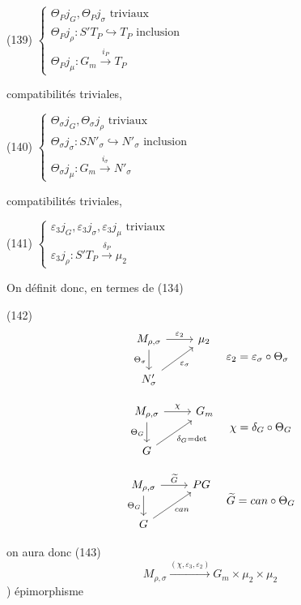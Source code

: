 \begin{enumerate}
\newpage


(139)
$\begin{cases}
\Theta_P j_G, \Theta_P j_\sigma \text{ triviaux} \\
\Theta_P j_\rho : S' T_P \hookrightarrow T_P \text{ inclusion} \\
\Theta_P j_\mu : G_m \xrightarrow{i_P} T_P
\end{cases}$

compatibilités triviales,

(140)
$\begin{cases}
\Theta_\sigma j_G, \Theta_\sigma j_\rho \text{ triviaux} \\
\Theta_\sigma j_\sigma : S N'_\sigma \hookrightarrow N'_\sigma \text{ inclusion} \\
\Theta_\sigma j_\mu : G_m \xrightarrow{i_\sigma} N'_\sigma
\end{cases}$

compatibilités triviales,

(141)
$\begin{cases}
\varepsilon_3 j_G, \varepsilon_3 j_\sigma, \varepsilon_3 j_\mu \text{ triviaux} \\
\varepsilon_3 j_\rho : S' T_P \xrightarrow{\delta_P} \mu_2
\end{cases}$

On définit donc, en termes de (134)

(142)
$$
\begin{tikzcd}
M_{\rho, \sigma} \ar[r, "\varepsilon_2"] \ar[d, "\Theta_\sigma"'] & \mu_2 \\
N'_\sigma \ar[ur, "\varepsilon_\sigma"'] &
\end{tikzcd}
\quad \varepsilon_2 = \varepsilon_\sigma \circ \Theta_\sigma
$$

$$
\begin{tikzcd}
M_{\rho, \sigma} \ar[r, "\chi"] \ar[d, "\Theta_G"'] & G_m \\
G \ar[ur, "\delta_G=\det"'] &
\end{tikzcd}
\quad \chi = \delta_G \circ \Theta_G
$$

$$
\begin{tikzcd}
M_{\rho, \sigma} \ar[r, "\widetilde{G}"] \ar[d, "\Theta_G"'] & P G \\
G \ar[ur, "can"'] &
\end{tikzcd}
\quad \widetilde{G} = can \circ \Theta_G
$$

on aura donc
(143)
$$
M_{\rho, \sigma} \xrightarrow{(\chi, \varepsilon_3, \varepsilon_2)} G_m \times \mu_2 \times \mu_2
$$
) épimorphisme


\end{enumerate}
